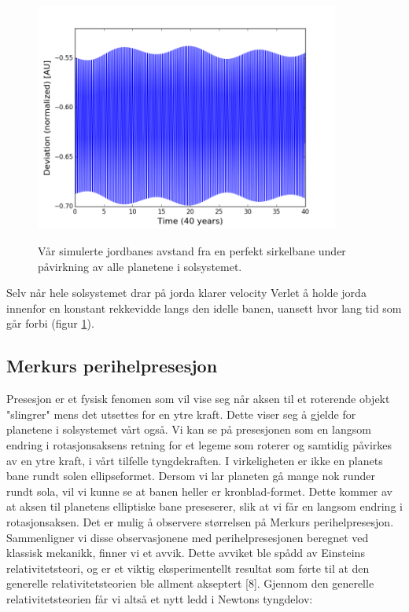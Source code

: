 \documentclass[11pt,a4paper]{article}
\begin{document}
\FloatBarrier
\begin{figure}[!ht]
\begin{center}
  \includegraphics[width = 100mm]{solar.png}\\
  \caption{Vår simulerte jordbanes avstand fra en perfekt sirkelbane under påvirkning av alle planetene i solsystemet.}   \label{all_error}
  \end{center}
  \end{figure}
\FloatBarrier
Selv når hele solsystemet drar på jorda klarer velocity Verlet å holde jorda innenfor en konstant rekkevidde langs den idelle banen, uansett hvor lang tid som går forbi (figur \ref{all_error}).

\subsection{Merkurs perihelpresesjon}
Presesjon er et fysisk fenomen som vil vise seg når aksen til et roterende objekt "slingrer" mens det utsettes for en ytre kraft. Dette viser seg å gjelde for planetene i solsystemet vårt også. Vi kan se på presesjonen som en langsom endring i rotasjonsaksens retning for et legeme som roterer og samtidig påvirkes av en ytre kraft, i vårt tilfelle tyngdekraften. I virkeligheten er ikke en planets bane rundt solen ellipseformet. Dersom vi lar planeten gå mange nok runder rundt sola, vil vi kunne se at banen heller er kronblad-formet. Dette kommer av at aksen til planetens elliptiske bane preseserer, slik at vi får en langsom endring i rotasjonsaksen. Det er mulig å observere størrelsen på Merkurs perihelpresesjon. Sammenligner vi disse observasjonene med perihelpresesjonen beregnet ved klassisk mekanikk, finner vi et avvik. Dette avviket ble spådd av Einsteins relativitetsteori, og er et viktig eksperimentellt resultat som førte til at den generelle relativitetsteorien ble allment akseptert [8]. Gjennom den generelle relativitetsteorien får vi altså et nytt ledd i Newtons tyngdelov: 
\end{document}
